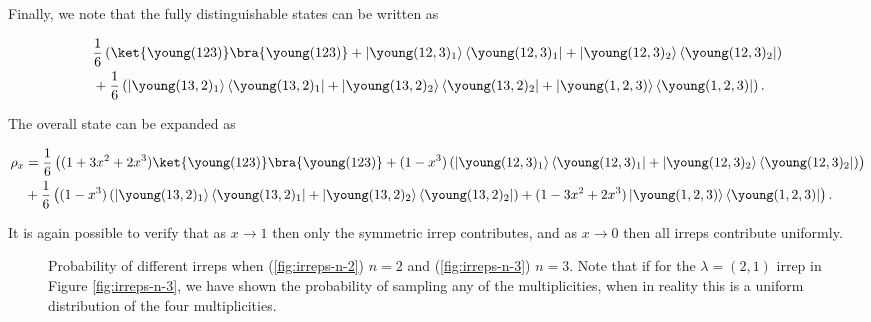 Finally, we note that the fully distinguishable states can be written as

\begin{align}
&\frac{1}{6}\left(\ket{\young(123)}\bra{\young(123)} + \left|\young(12,3)_1\right\rangle\left\langle\young(12,3)_1\right| + \left|\young(12,3)_2\right\rangle\left\langle\young(12,3)_2\right|\right)\nonumber\\
&+\frac{1}{6}\left(\left|\young(13,2)_1\right\rangle\left\langle\young(13,2)_1\right| + \left|\young(13,2)_2\right\rangle\left\langle\young(13,2)_2\right| + \left|\young(1,2,3)\right\rangle\left\langle\young(1,2,3)\right|\right).
\end{align}

The overall state can be expanded as

\begin{align}
\rho_x &= \frac{1}{6}\left((1+3x^2+2x^3)\ket{\young(123)}\bra{\young(123)} + (1-x^3)\left(\left|\young(12,3)_1\right\rangle\left\langle\young(12,3)_1\right| + \left|\young(12,3)_2\right\rangle\left\langle\young(12,3)_2\right|\right)\right)\nonumber\\
&+\frac{1}{6}\left((1-x^3)\left(\left|\young(13,2)_1\right\rangle\left\langle\young(13,2)_1\right| + \left|\young(13,2)_2\right\rangle\left\langle\young(13,2)_2\right|\right) + (1-3x^2+2x^3)\left|\young(1,2,3)\right\rangle\left\langle\young(1,2,3)\right|\right).
\end{align}

It is again possible to verify that as $x\rightarrow 1$ then only the symmetric irrep contributes, and as $x \rightarrow 0$ then all irreps contribute uniformly.

\begin{figure}
\hfill
{}
\caption[Probability of different irreps when $n=2$ and $n=3$.]{\label{fig:irreps} Probability of different irreps when (\ref{fig:irreps-n-2}) $n=2$ and (\ref{fig:irreps-n-3}) $n=3$. Note that if for the $\lambda=(2,1)$ irrep in Figure \ref{fig:irreps-n-3}, we have shown the probability of sampling any of the multiplicities, when in reality this is a uniform distribution of the four multiplicities.}
\end{figure}

